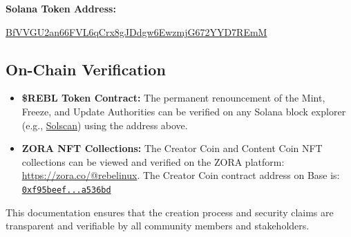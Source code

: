 \documentclass{article}
\begin{document}
\vspace{0.5em}
\noindent
\textbf{Solana Token Address:}
\begin{center}
    \href{https://solscan.io/token/BfVVGU2an66FVL6qCrx8gJDdgw6EwzmjG672YYD7REmM}{\ttfamily BfVVGU2an66FVL6qCrx8gJDdgw6EwzmjG672YYD7REmM}
\end{center}

\subsection*{On-Chain Verification}
\begin{itemize}
    \item \textbf{\$REBL Token Contract:} The permanent renouncement of the Mint, Freeze, and Update Authorities can be verified on any Solana block explorer (e.g., \href{https://solscan.io/token/BfVVGU2an66FVL6qCrx8gJDdgw6EwzmjG672YYD7REmM}{Solscan}) using the address above.
    \item \textbf{ZORA NFT Collections:} The Creator Coin and Content Coin NFT collections can be viewed and verified on the ZORA platform: \href{https://zora.co/@rebelinux}{https://zora.co/@rebelinux}. The Creator Coin contract address on Base is: \href{https://basescan.org/token/0xf95beef6439ec38fa757238cdec8417abda536bd}{\texttt{0xf95beef...a536bd}}
\end{itemize}

\bigskip
\noindent
This documentation ensures that the creation process and security claims are transparent and verifiable by all community members and stakeholders.
\end{document}
